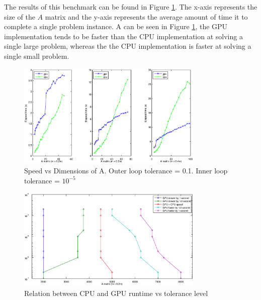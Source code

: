 \documentclass[10pt,twocolumn,letterpaper]{article}
\begin{document}
The results of this benchmark can be found in Figure \ref{fig:random_data}.
The x-axis represents the size of the $A$ matrix and the y-axis represents the
average amount of time it to complete a single problem instance.  A can be seen
in Figure \ref{fig:random_data}, the GPU implementation tends to be faster than
the CPU implementation at solving a single large problem, whereas the the CPU
implementation is faster at solving a single small problem.  
\begin{figure}
\begin{center}
\includegraphics[width=3.5in]{results/random_data/time_vs_matrix_size_constant_tol}
\end{center}
\caption{Speed vs Dimensions of A.  Outer loop tolerance = 0.1.  Inner loop tolerance = $10^{-5}$}
\label{fig:random_data}
\end{figure}

\begin{figure}
\begin{center}
\includegraphics[width=3.5in]{results/random_data/size_vs_speed_crossover_ratio_2}
\end{center}
\caption{Relation between CPU and GPU runtime vs tolerance level}
\label{fig:random_data2}
\end{figure}
\end{document}
